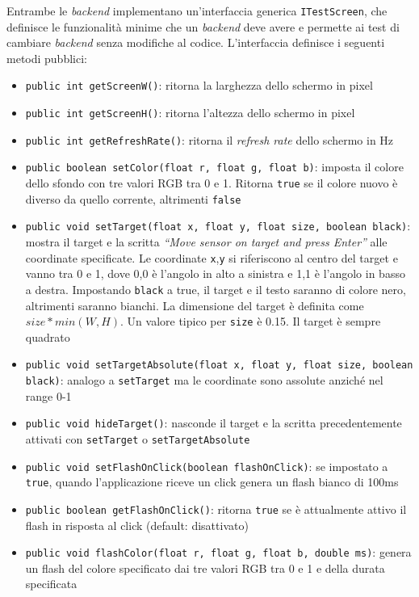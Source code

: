Entrambe le \textit{backend} implementano un'interfaccia generica \texttt{ITestScreen}, che definisce le funzionalità minime che un \textit{backend} deve avere e permette ai test di cambiare \textit{backend} senza modifiche al codice. L'interfaccia definisce i seguenti metodi pubblici:
\begin{itemize}
	\item \texttt{public int getScreenW()}: ritorna la larghezza dello schermo in pixel
	\item \texttt{public int getScreenH()}: ritorna l'altezza dello schermo in pixel
	\item \texttt{public int getRefreshRate()}: ritorna il \textit{refresh rate} dello schermo in Hz
	\item \texttt{public boolean setColor(float r, float g, float b)}: imposta il colore dello sfondo con tre valori RGB tra 0 e 1. Ritorna \texttt{true} se il colore nuovo è diverso da quello corrente, altrimenti \texttt{false}
	\item \texttt{public void setTarget(float x, float y, float size, boolean black)}: mostra il target e la scritta \textit{``Move sensor on target and press Enter''} alle coordinate specificate. Le coordinate \texttt{x},\texttt{y} si riferiscono al centro del target e vanno tra 0 e 1, dove 0,0 è l'angolo in alto a sinistra e 1,1 è l'angolo in basso a destra. Impostando \texttt{black} a true, il target e il testo saranno di colore nero, altrimenti saranno bianchi. La dimensione del target è definita come ${size*min(W,H)}$. Un valore tipico per \texttt{size} è 0.15. Il target è sempre quadrato
	\item \texttt{public void setTargetAbsolute(float x, float y, float size, boolean black)}: analogo a \texttt{setTarget} ma le coordinate sono assolute anziché nel range 0-1
	\item \texttt{public void hideTarget()}: nasconde il target e la scritta precedentemente attivati con \texttt{setTarget} o \texttt{setTargetAbsolute}
	\item \texttt{public void setFlashOnClick(boolean flashOnClick)}: se impostato a \texttt{true}, quando l'applicazione riceve un click genera un flash bianco di 100ms
	\item \texttt{public boolean getFlashOnClick()}: ritorna \texttt{true} se è attualmente attivo il flash in risposta al click (default: disattivato)
	\item \texttt{public void flashColor(float r, float g, float b, double ms)}: genera un flash del colore specificato dai tre valori RGB tra 0 e 1 e della durata specificata

\end{itemize}
